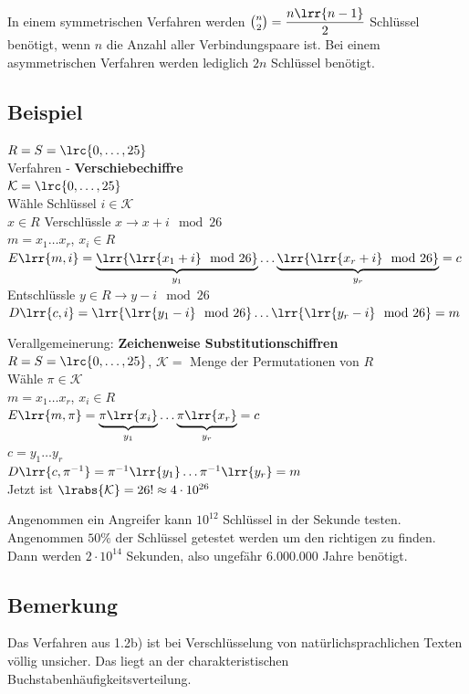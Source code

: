 		In einem symmetrischen Verfahren werden $\binom{n}{2}=\dfrac{n\lrr{n-1}}{2}$ Schlüssel benötigt, wenn $n$ die Anzahl aller Verbindungspaare ist. Bei einem asymmetrischen Verfahren werden lediglich $2n$ Schlüssel benötigt.
	\subsection{Beispiel}
			\item $R=S=\lrc{0,\dots,25}$ \\
				Verfahren - \textbf{Verschiebechiffre}\\
				$\mathcal{K}=\lrc{0,\dots,25}$ \\
				Wähle Schlüssel $i\in\mathcal{K}$\\
				$x\in R$ Verschlüssle $x\rightarrow x+i\mod 26$\\
				$m=x_1\dots x_r$, $x_i\in R$\\
				$E\lrr{m,i}=\underbrace{\lrr{\lrr{x_1+i}\mod 26}}_{y_1}\dots\underbrace{\lrr{\lrr{x_r+i}\mod 26}}_{y_r}=c$\\
				Entschlüssle $y\in R \rightarrow y-i\mod 26$\\
				$D\lrr{c,i}=\lrr{\lrr{y_1-i}\mod 26}\dots\lrr{\lrr{y_r-i}\mod 26}=m$
			\item Verallgemeinerung: \textbf{Zeichenweise Substitutionschiffren}\\
				$R=S=\lrc{0,\dots,25}$, $\mathcal{K}=$ Menge der Permutationen von $R$\\
				Wähle $\pi\in\mathcal{K}$\\
				$m=x_1\dots x_r$, $x_i\in R$\\
				$E\lrr{m,\pi}=\underbrace{\pi\lrr{x_i}}_{y_1}\dots\underbrace{\pi\lrr{x_r}}_{y_r}=c$\\
				$c=y_1\dots y_r$\\
				$D\lrr{c,\pi^{-1}}=\pi^{-1}\lrr{y_1}\dots\pi^{-1}\lrr{y_r}=m$\\
				Jetzt ist $\lrabs{\mathcal{K}}=26!\approx 4\cdot10^{26}$
			
				Angenommen ein Angreifer kann $10^{12}$ Schlüssel in der Sekunde testen.\\
				Angenommen $50\%$ der Schlüssel getestet werden um den richtigen zu finden.\\
				Dann werden $2\cdot 10^{14}$ Sekunden, also ungefähr $6.000.000$ Jahre benötigt.
		\subExEnd
	\subsection{Bemerkung}
		Das Verfahren aus 1.2b) ist bei Verschlüsselung von natürlichsprachlichen Texten völlig unsicher. Das liegt an der charakteristischen Buchstabenhäufigkeitsverteilung.

